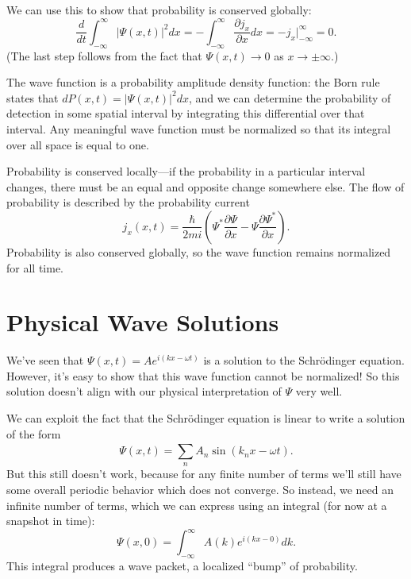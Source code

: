 \documentclass[../p052main.tex]{subfiles}
\begin{document}
We can use this to show that probability is conserved globally:
\[ \frac{d}{dt} \int_{-\infty}^{\infty} |\Psi(x,t)|^2 dx = -\int_{-\infty}^{\infty} \frac{\partial j_x}{\partial x}dx = -j_x \Big|_{-\infty}^\infty = 0. \]
(The last step follows from the fact that $\Psi(x,t) \to 0$ as $x \to \pm \infty$.)

\begin{summary}
    The wave function is a probability amplitude density function: the Born rule states that $dP(x,t) = |\Psi(x,t)|^2 dx$, and we can determine the probability of detection in some spatial interval by integrating this differential over that interval.
    Any meaningful wave function must be normalized so that its integral over all space is equal to one.

    Probability is conserved locally---if the probability in a particular interval changes, there must be an equal and opposite change somewhere else.
    The flow of probability is described by the probability current
    \[ j_x(x,t) = \frac{\hbar}{2mi} \left( \Psi^* \frac{\partial \Psi}{\partial x} - \Psi \frac{\partial \Psi^*}{\partial x} \right). \]
    Probability is also conserved globally, so the wave function remains normalized for all time.
\end{summary}

\section{Physical Wave Solutions}
We've seen that $\Psi(x,t) = Ae^{i(kx - \omega t)}$ is a solution to the Schrödinger equation.
However, it's easy to show that this wave function cannot be normalized!
So this solution doesn't align with our physical interpretation of $\Psi$ very well.

We can exploit the fact that the Schrödinger equation is linear to write a solution of the form
\[ \Psi(x,t) = \sum_{n}^{} A_n \sin (k_n x - \omega t). \]
But this still doesn't work, because for any finite number of terms we'll still have some overall periodic behavior which does not converge.
So instead, we need an infinite number of terms, which we can express using an integral (for now at a snapshot in time):
\[ \Psi(x,0) = \int_{-\infty}^{\infty} A(k) e^{i(kx - 0)}dk. \]
This integral produces a wave packet, a localized ``bump'' of probability.
\end{document}
